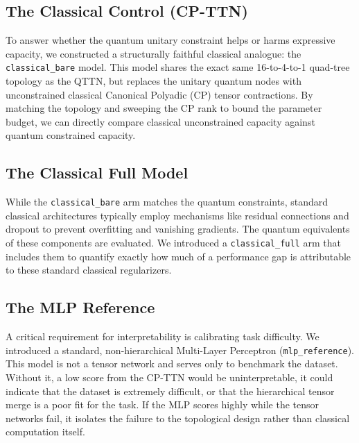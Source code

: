\documentclass[12pt, a4paper, oneside]{report}
\begin{document}
\subsection{The Classical Control (CP-TTN)}
To answer whether the quantum unitary constraint helps or harms expressive capacity, we constructed a structurally faithful classical analogue: the \texttt{classical\_bare} model. This model shares the exact same 16-to-4-to-1 quad-tree topology as the QTTN, but replaces the unitary quantum nodes with unconstrained classical Canonical Polyadic (CP)\cite{cp_decomposition} tensor contractions. By matching the topology and sweeping the CP rank to bound the parameter budget, we can directly compare classical unconstrained capacity against quantum constrained capacity.

\subsection{The Classical Full Model}
While the \texttt{classical\_bare} arm matches the quantum constraints, standard classical architectures typically employ mechanisms like residual connections and dropout to prevent overfitting and vanishing gradients. The quantum equivalents of these components are evaluated. We introduced a \texttt{classical\_full} arm that includes them to quantify exactly how much of a performance gap is attributable to these standard classical regularizers.

\subsection{The MLP Reference}
A critical requirement for interpretability is calibrating task difficulty. We introduced a standard, non-hierarchical Multi-Layer Perceptron (\texttt{mlp\_reference}). This model is not a tensor network and serves only to benchmark the dataset. Without it, a low score from the CP-TTN would be uninterpretable, it could indicate that the dataset is extremely difficult, or that the hierarchical tensor merge is a poor fit for the task. If the MLP scores highly while the tensor networks fail, it isolates the failure to the topological design rather than classical computation itself.
\end{document}
